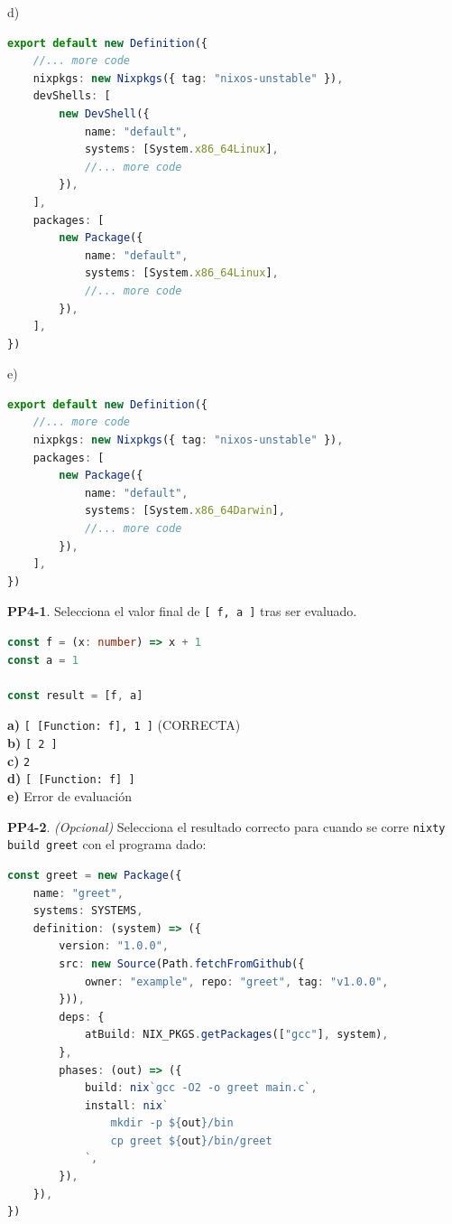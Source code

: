 \begin{opcion}{d)}
\begin{lstlisting}[language=TypeScript]
export default new Definition({
    //... more code
    nixpkgs: new Nixpkgs({ tag: "nixos-unstable" }),
    devShells: [
        new DevShell({
            name: "default",
            systems: [System.x86_64Linux],
            //... more code
        }),
    ],
    packages: [
        new Package({
            name: "default",
            systems: [System.x86_64Linux],
            //... more code
        }),
    ],
})
\end{lstlisting}
\end{opcion}

\begin{opcion}{e)}
\begin{lstlisting}[language=TypeScript]
export default new Definition({
    //... more code
    nixpkgs: new Nixpkgs({ tag: "nixos-unstable" }),
    packages: [
        new Package({
            name: "default",
            systems: [System.x86_64Darwin],
            //... more code
        }),
    ],
})
\end{lstlisting}
\end{opcion}

\textbf{PP4-1}. Selecciona el valor final de \texttt{[ f, a ]} tras ser evaluado.

\begin{bloquecodigo}
\begin{lstlisting}[language=TypeScript]
const f = (x: number) => x + 1
const a = 1

const result = [f, a]
\end{lstlisting}
\end{bloquecodigo}

\textbf{a)} \texttt{[ [Function: f], 1 ]} (CORRECTA)\\
\textbf{b)} \texttt{[ 2 ]}\\
\textbf{c)} \texttt{2}\\
\textbf{d)} \texttt{[ [Function: f] ]}\\
\textbf{e)} Error de evaluación

\textbf{PP4-2}. \emph{(Opcional)} Selecciona el resultado correcto para cuando se corre \texttt{nixty build greet} con el programa dado:

\begin{bloquecodigo}
\begin{lstlisting}[language=TypeScript]
const greet = new Package({
    name: "greet",
    systems: SYSTEMS,
    definition: (system) => ({
        version: "1.0.0",
        src: new Source(Path.fetchFromGithub({
            owner: "example", repo: "greet", tag: "v1.0.0",
        })),
        deps: {
            atBuild: NIX_PKGS.getPackages(["gcc"], system),
        },
        phases: (out) => ({
            build: nix`gcc -O2 -o greet main.c`,
            install: nix`
                mkdir -p ${out}/bin
                cp greet ${out}/bin/greet
            `,
        }),
    }),
})
\end{lstlisting}
\end{bloquecodigo}

